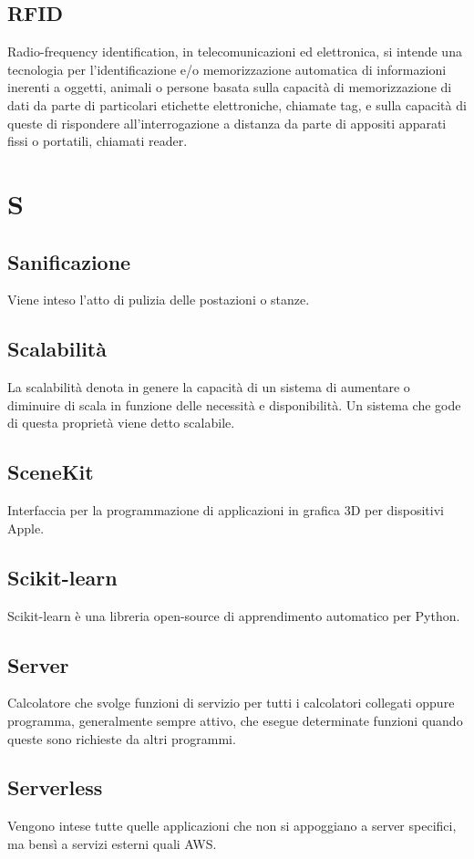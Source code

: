 \subsection{RFID} Radio-frequency identification, in telecomunicazioni ed elettronica, si intende una tecnologia per l'identificazione e/o memorizzazione automatica di informazioni inerenti a oggetti, animali o persone basata sulla capacità di memorizzazione di dati da parte di particolari etichette elettroniche, chiamate tag, e sulla capacità di queste di rispondere all'interrogazione a distanza da parte di appositi apparati fissi o portatili, chiamati reader.
\newpage \section{S}
\subsection{Sanificazione} Viene inteso l'atto di pulizia delle postazioni o stanze.
\subsection{Scalabilità} La scalabilità denota in genere la capacità di un sistema di aumentare o diminuire di scala in funzione delle necessità e disponibilità. Un sistema che gode di questa proprietà viene detto scalabile.
\subsection{SceneKit} Interfaccia per la programmazione di applicazioni in grafica 3D per dispositivi Apple.
\subsection{Scikit-learn} Scikit-learn è una libreria open-source di apprendimento automatico per Python.
\subsection{Server} Calcolatore che svolge funzioni di servizio per tutti i calcolatori collegati oppure programma, generalmente sempre attivo, che esegue determinate funzioni quando queste sono richieste da altri programmi.
\subsection{Serverless} Vengono intese tutte quelle applicazioni che non si appoggiano a server specifici, ma bensì a servizi esterni quali AWS.
